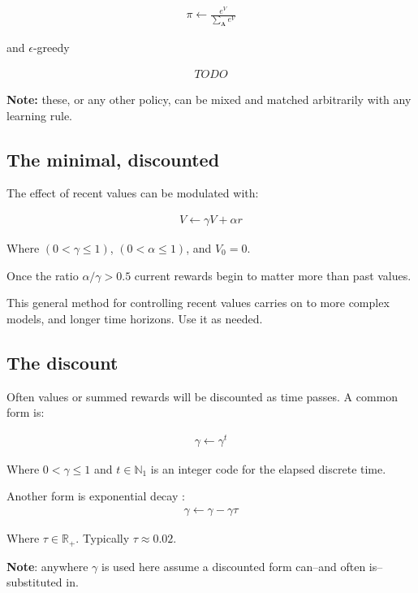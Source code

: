 \documentclass[8pt]{article}
\begin{document}
\begin{multicols}{4}
\begin{eqnarray}
    \pi \leftarrow \frac{e^{V}}{\sum_\textbf{A}{e^{V}}} 
\end{eqnarray}

and $\epsilon$-greedy

\begin{eqnarray}
    TODO
\end{eqnarray}

\textbf{Note:} these, or any other policy, can be mixed and matched arbitrarily with any learning rule.  


\subsection*{The minimal, discounted}
The effect of recent values can be modulated with:

\begin{eqnarray}
    V \leftarrow \gamma V + \alpha r 
\end{eqnarray}

Where $(0 < \gamma \leq 1)$, $(0 < \alpha \leq 1)$, and $V_0 = 0$. 

Once the ratio $\alpha/\gamma > 0.5$ current rewards begin to matter more than past values.

This general method for controlling recent values carries on to more complex models, and longer time horizons. Use it as needed.

\subsection*{The discount}
Often values or summed rewards will be discounted as time passes. A common form is:

\begin{eqnarray}
    \gamma \leftarrow \gamma ^ t
\end{eqnarray}

Where $0 < \gamma \leq 1$ and $t \in \mathbb{N}_1$ is an integer code for the elapsed discrete time.

Another form is exponential decay \cite{Francois-Lavet2015}:
\begin{eqnarray}
    \gamma \leftarrow \gamma - \gamma \tau
\end{eqnarray}

Where $\tau \in \mathbb{R}_+$. Typically $\tau \approx 0.02$.

\textbf{Note}: anywhere $\gamma$ is used here assume a discounted form can--and often is--substituted in.



\end{multicols}
\end{document}
